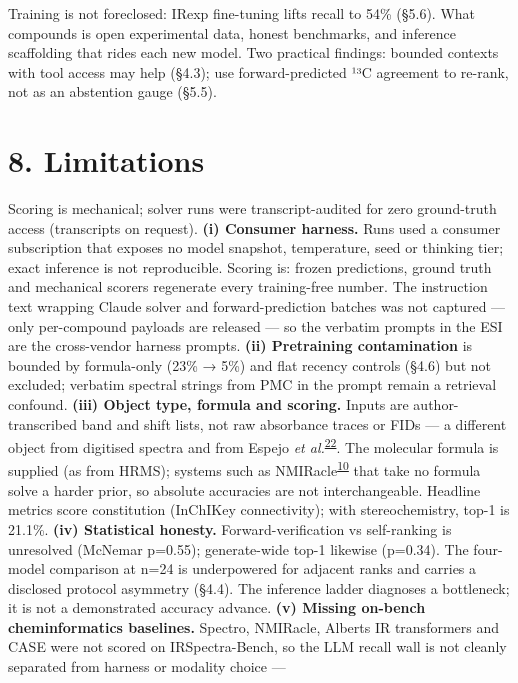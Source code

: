 \documentclass[
  10pt,
]{article}
\begin{document}
Training is not foreclosed: IRexp fine-tuning lifts recall to 54\%
(§5.6). What compounds is open experimental data, honest benchmarks, and
inference scaffolding that rides each new model. Two practical findings:
bounded contexts with tool access may help (§4.3); use forward-predicted
¹³C agreement to re-rank, not as an abstention gauge (§5.5).

\hypertarget{limitations}{%
\section{8. Limitations}\label{limitations}}

Scoring is mechanical; solver runs were transcript-audited for zero
ground-truth access (transcripts on request). \textbf{(i) Consumer
harness.} Runs used a consumer subscription that exposes no model
snapshot, temperature, seed or thinking tier; exact inference is not
reproducible. Scoring is: frozen predictions, ground truth and
mechanical scorers regenerate every training-free number. The
instruction text wrapping Claude solver and forward-prediction batches
was not captured --- only per-compound payloads are released --- so the
verbatim prompts in the ESI are the cross-vendor harness prompts.
\textbf{(ii) Pretraining contamination} is bounded by formula-only (23\%
→ 5\%) and flat recency controls (§4.6) but not excluded; verbatim
spectral strings from PMC in the prompt remain a retrieval confound.
\textbf{(iii) Object type, formula and scoring.} Inputs are
author-transcribed band and shift lists, not raw absorbance traces or
FIDs --- a different object from digitised spectra and from Espejo
\emph{et
al.}\textsuperscript{\protect\hyperlink{ref-espejo2026agentic}{22}}. The
molecular formula is supplied (as from HRMS); systems such as
NMIRacle\textsuperscript{\protect\hyperlink{ref-ottomano2025nmiracle}{10}}
that take no formula solve a harder prior, so absolute accuracies are
not interchangeable. Headline metrics score constitution (InChIKey
connectivity); with stereochemistry, top-1 is 21.1\%. \textbf{(iv)
Statistical honesty.} Forward-verification vs self-ranking is unresolved
(McNemar p=0.55); generate-wide top-1 likewise (p=0.34). The four-model
comparison at n=24 is underpowered for adjacent ranks and carries a
disclosed protocol asymmetry (§4.4). The inference ladder diagnoses a
bottleneck; it is not a demonstrated accuracy advance. \textbf{(v)
Missing on-bench cheminformatics baselines.} Spectro, NMIRacle, Alberts
IR transformers and CASE were not scored on IRSpectra-Bench, so the LLM
recall wall is not cleanly separated from harness or modality choice ---
\end{document}
